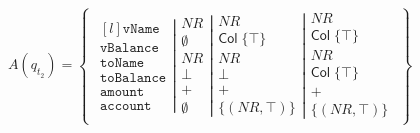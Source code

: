 \begin{align}
    A(q_{t_2})=\left\{\begin{matrix}
                          \left.\begin{matrix*}[l]
                                    \texttt{vName}\\
                                    \texttt{vBalance}\\
                                    \texttt{toName}\\
                                    \texttt{toBalance}\\
                                    \texttt{amount}\\
                                    \texttt{account}
                          \end{matrix*}\right|
                          \left.\begin{matrix}
                                    NR\\
                                    \emptyset\\
                                    NR\\
                                    \bot\\
                                    +\\
                                    \emptyset
                          \end{matrix}\right|
                          \left.\begin{matrix}
                                    NR\\
                                    \mathsf{Col} \; \{\top\}\\
                                    NR\\
                                    \bot\\
                                    +\\
                                    \{(NR, \top)\}
                          \end{matrix}\right|
                          \begin{matrix}
                              NR\\
                              \mathsf{Col} \; \{\top\}\\
                              NR\\
                              \mathsf{Col} \; \{\top\}\\
                              +\\
                              \{(NR, \top)\}
                          \end{matrix}
    \end{matrix}\right\}
\end{align}

